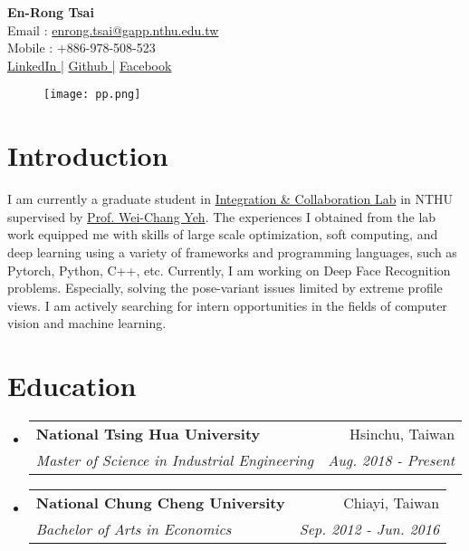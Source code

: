 \documentclass[letterpaper,11pt]{article}
\makeatletter
\newcommand{\resumeSubheading}[4]{
  \vspace{-1pt}\item
    \begin{tabular*}{0.97\textwidth}{l@{\extracolsep{\fill}}r}
      \textbf{#1} & #2 \\
      \textit{\small#3} & \textit{\small #4} \\
    \end{tabular*}\vspace{-5pt}
}
\newcommand{\resumeSubHeadingListStart}{\begin{itemize}[leftmargin=*]}
\newcommand{\resumeSubHeadingListEnd}{\end{itemize}}
\makeatother
\begin{document}
\hspace{-7mm}
\begin{minipage}{0.6\textwidth}
    \vspace{9mm}\textbf{\LARGE En-Rong Tsai}\vspace{1mm}\\
        Email :  \href{mailto:enrong.tsai@gapp.nthu.edu.tw}{enrong.tsai@gapp.nthu.edu.tw} \\
        Mobile :  +886-978-508-523 \\
        \href{https://www.linkedin.com/in/enrong-tsai}{LinkedIn |}
        \href{https://github.com/enrongtsai}{Github |}
        \href{https://www.facebook.com/enrong.tsai}{Facebook} \\
\end{minipage}
\hfill
  \begin{minipage}{0.16\textwidth}
\begin{figure}[H]
  \texttt{[image: pp.png]}
\end{figure}
\end{minipage}

\vspace{-14pt}
\section{Introduction}
  \resumeSubHeadingListStart
      {I am currently a graduate student in \href{http://yehlab.synology.me/wordpress/special-session/}{Integration \& Collaboration Lab} in NTHU supervised by \href{https://www.researchgate.net/profile/Wei-Chang_Yeh}{Prof. Wei-Chang Yeh}. The experiences I obtained from the lab work equipped me with skills of large scale optimization, soft computing, and deep learning using a variety of frameworks and programming languages, such as Pytorch, Python, C++, etc. Currently, I am working on Deep Face Recognition problems. Especially, solving the pose-variant issues limited by extreme profile views. I am actively searching for intern opportunities in the fields of computer vision and machine learning.}
  \resumeSubHeadingListEnd

\section{Education}
  \resumeSubHeadingListStart
    \resumeSubheading
      {National Tsing Hua University}{Hsinchu, Taiwan}
      {Master of Science in Industrial Engineering}{Aug. 2018 - Present}
    \resumeSubheading
      {National Chung Cheng University}{Chiayi, Taiwan}
      {Bachelor of Arts in Economics}{Sep. 2012 - Jun. 2016}
  \resumeSubHeadingListEnd
\end{document}
